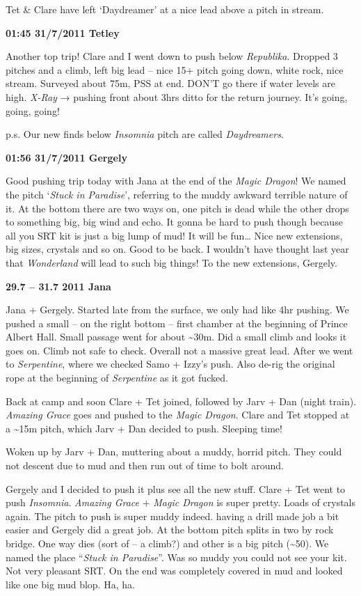 Tet \& Clare have left `Daydreamer' at a nice lead above a pitch in
stream.

\textbf{01:45 31/7/2011 Tetley}

Another top trip! Clare and I went down to push below \emph{Republika}.
Dropped 3 pitches and a climb, left big lead -- nice 15+ pitch going
down, white rock, nice stream. Surveyed about 75m, PSS at end. DON'T go
there if water levels are high. \emph{X-Ray} → pushing front about 3hrs
ditto for the return journey. It's going, going, going!

p.s. Our new finds below \emph{Insomnia} pitch are called
\emph{Daydreamers}.

\textbf{01:56 31/7/2011 Gergely}

Good pushing trip today with Jana at the end of the \emph{Magic Dragon}!
We named the pitch `\emph{Stuck in Paradise}', referring to the muddy
awkward terrible nature of it. At the bottom there are two ways on, one
pitch is dead while the other drops to something big, big wind and echo.
It gonna be hard to push though because all you SRT kit is just a big
lump of mud! It will be fun\ldots{} Nice new extensions, big sizes,
crystals and so on. Good to be back. I wouldn't have thought last year
that \emph{Wonderland} will lead to such big things! To the new
extensions, Gergely.

\textbf{29.7 -- 31.7 2011 Jana}

Jana + Gergely. Started late from the surface, we only had like 4hr
pushing. We pushed a small -- on the right bottom -- first chamber at
the beginning of Prince Albert Hall. Small passage went for about
\textasciitilde{}30m. Did a small climb and looks it goes on. Climb not
safe to check. Overall not a massive great lead. After we went to
\emph{Serpentine}, where we checked Samo + Izzy's push. Also de-rig the
original rope at the beginning of \emph{Serpentine} as it got fucked.

Back at camp and soon Clare + Tet joined, followed by Jarv + Dan (night
train). \emph{Amazing Grace} goes and pushed to the \emph{Magic Dragon}.
Clare and Tet stopped at a \textasciitilde{}15m pitch, which Jarv + Dan
decided to push. Sleeping time!

Woken up by Jarv + Dan, muttering about a muddy, horrid pitch. They
could not descent due to mud and then run out of time to bolt around.

Gergely and I decided to push it plus see all the new stuff. Clare + Tet
went to push \emph{Insomnia}. \emph{Amazing Grace} + \emph{Magic Dragon}
is super pretty. Loads of crystals again. The pitch to push is super
muddy indeed. having a drill made job a bit easier and Gergely did a
great job. At the bottom pitch splits in two by rock bridge. One way
dies (sort of -- a climb?) and other is a big pitch
(\textasciitilde{}50). We named the place ``\emph{Stuck in Paradise}''.
Was so muddy you could not see your kit. Not very pleasant SRT. On the
end was completely covered in mud and looked like one big mud blop. Ha,
ha.


